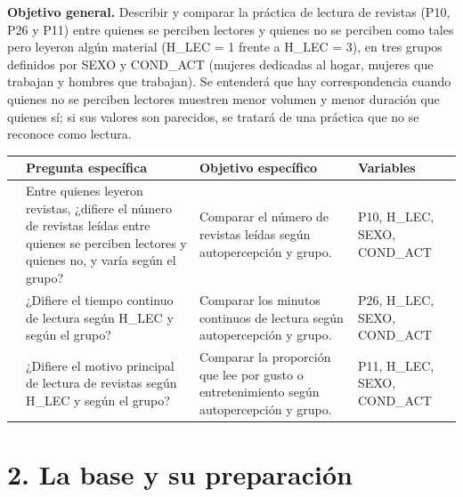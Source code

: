 \documentclass[
  spanish,
  12pt,
]{extarticle}
\begin{document}
\textbf{Objetivo general.} Describir y comparar la práctica de lectura
de revistas (P10, P26 y P11) entre quienes se perciben lectores y
quienes no se perciben como tales pero leyeron algún material (H\_LEC =
1 frente a H\_LEC = 3), en tres grupos definidos por SEXO y COND\_ACT
(mujeres dedicadas al hogar, mujeres que trabajan y hombres que
trabajan). Se entenderá que hay correspondencia cuando quienes no se
perciben lectores muestren menor volumen y menor duración que quienes
sí; si sus valores son parecidos, se tratará de una práctica que no se
reconoce como lectura.

\begin{longtable}[]{@{}
  >{\raggedright\arraybackslash}p{}
  >{\raggedright\arraybackslash}p{}
  >{\raggedright\arraybackslash}p{}
  >{\raggedright\arraybackslash}p{}@{}}
\toprule\noalign{}
\begin{minipage}[b]{\linewidth}\raggedright
\end{minipage} & \begin{minipage}[b]{\linewidth}\raggedright
Pregunta específica
\end{minipage} & \begin{minipage}[b]{\linewidth}\raggedright
Objetivo específico
\end{minipage} & \begin{minipage}[b]{\linewidth}\raggedright
Variables
\end{minipage} \\
\midrule\noalign{}
\endhead
\bottomrule\noalign{}
\endlastfoot
1 & Entre quienes leyeron revistas, ¿difiere el número de revistas
leídas entre quienes se perciben lectores y quienes no, y varía según el
grupo? & Comparar el número de revistas leídas según autopercepción y
grupo. & P10, H\_LEC, SEXO, COND\_ACT \\
2 & ¿Difiere el tiempo continuo de lectura según H\_LEC y según el
grupo? & Comparar los minutos continuos de lectura según autopercepción
y grupo. & P26, H\_LEC, SEXO, COND\_ACT \\
3 & ¿Difiere el motivo principal de lectura de revistas según H\_LEC y
según el grupo? & Comparar la proporción que lee por gusto o
entretenimiento según autopercepción y grupo. & P11, H\_LEC, SEXO,
COND\_ACT \\
\end{longtable}

\section{2. La base y su preparación}\label{la-base-y-su-preparaciuxf3n}
\end{document}
